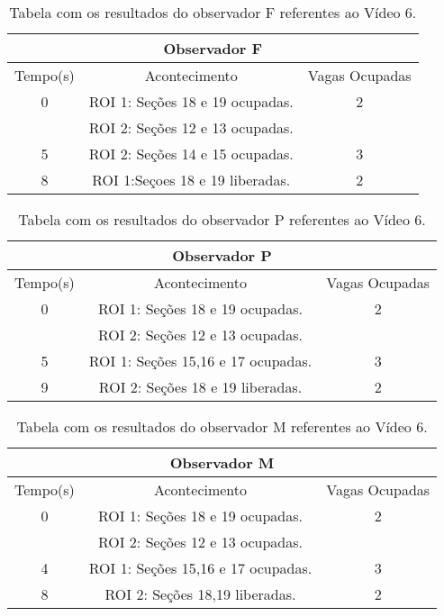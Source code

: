 \begin{table}[H]
\begin{center}
\begin{tabular}{|c||c||c|}
\hline
\multicolumn{3}{|c|}{Observador F}  \\ \hline \hline
Tempo(s) & Acontecimento & Vagas Ocupadas \\ \hline
0 & ROI 1: Seções 18 e 19 ocupadas. & 2 \\
 & ROI 2: Seções 12 e 13 ocupadas. &  \\ \hline
5 & ROI 2: Seções 14 e 15 ocupadas. & 3 \\ \hline
8 & ROI 1:Seçoes 18 e 19 liberadas. & 2 \\
\hline

\end{tabular}
\end{center}
\caption{Tabela com os resultados do observador F referentes ao Vídeo 6.}
\label{tab:video6F}
\end{table}

\begin{table}[H]
\begin{center}
\begin{tabular}{|c||c||c|}
\hline
\multicolumn{3}{|c|}{Observador P}  \\ \hline \hline
Tempo(s) & Acontecimento & Vagas Ocupadas \\ \hline
0 & ROI 1: Seções 18 e 19 ocupadas. & 2 \\
 & ROI 2: Seções 12 e 13 ocupadas. &  \\ \hline
5 & ROI 1: Seções 15,16 e 17 ocupadas. & 3 \\ \hline
9 & ROI 2: Seções 18 e 19 liberadas. & 2 \\
\hline

\end{tabular}
\end{center}
\caption{Tabela com os resultados do observador P referentes ao Vídeo 6.}
\label{tab:video6P}
\end{table}

\begin{table}[H]
\begin{center}
\begin{tabular}{|c||c||c|}
\hline
\multicolumn{3}{|c|}{Observador M}  \\ \hline \hline
Tempo(s) & Acontecimento & Vagas Ocupadas \\ \hline
0 & ROI 1: Seções 18 e 19 ocupadas. & 2 \\
 & ROI 2: Seções 12 e 13 ocupadas. &  \\ \hline
4 & ROI 1: Seções 15,16 e 17 ocupadas. & 3 \\ \hline
8 & ROI 2: Seções 18,19 liberadas. & 2\\
\hline

\end{tabular}
\end{center}
\caption{Tabela com os resultados do observador M referentes ao Vídeo 6.}
\label{tab:video6M}
\end{table}


